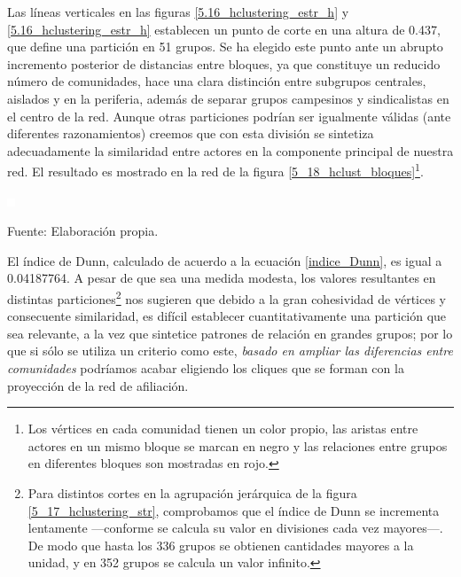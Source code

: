 \documentclass[letterpaper, 11pt]{book}
\theoremstyle{definition}
\theoremstyle{remark}
\begin{document}
Las líneas verticales en las figuras \ref{5.16_hclustering_estr_h} y \ref{5.16_hclustering_estr_h} establecen un punto de corte en una altura de 0.437, que define una partición en 51 grupos. 
Se ha elegido este punto ante un abrupto incremento posterior de distancias entre bloques, ya que constituye un reducido número de comunidades, hace una clara distinción entre subgrupos centrales, aislados y en la periferia, además de separar grupos campesinos y sindicalistas en el centro de la red. 
Aunque otras particiones podrían ser igualmente válidas (ante diferentes razonamientos) creemos que con esta división se sintetiza adecuadamente la similaridad entre actores en la componente principal de nuestra red. 
El resultado es mostrado en la red de la figura \ref{5_18_hclust_bloques}\footnote{
    Los vértices en cada comunidad tienen un color propio, las aristas entre actores en un mismo bloque se marcan en negro y las relaciones entre grupos en diferentes bloques son mostradas en rojo. 
}. 



\begin{minipage}{\linewidth}
\centering
{} \label{5_18_hclust_bloques}

\includegraphics[scale=0.1]{img/null.png}
\vspace{29em}
\par\bigskip
\small Fuente: Elaboración propia.
\end{minipage}\bigskip


El índice de Dunn, calculado de acuerdo a la ecuación \ref{indice_Dunn}, es igual a 0.04187764. 
A pesar de que sea una medida modesta, los valores resultantes en distintas particiones\footnote{
    Para distintos cortes en la agrupación jerárquica de la figura \ref{5_17_hclustering_str}, comprobamos que el índice de Dunn se incrementa lentamente ---conforme se calcula su valor en divisiones cada vez mayores---. 
    De modo que hasta los 336 grupos se obtienen cantidades mayores a la unidad, y en 352 grupos se calcula un valor infinito. 
} 
nos sugieren que debido a la gran cohesividad de vértices y consecuente similaridad, es difícil establecer cuantitativamente una partición que sea relevante, a la vez que sintetice patrones de relación en grandes grupos; por lo que si sólo se utiliza un criterio como este, \emph{basado en ampliar las diferencias entre comunidades} podríamos acabar eligiendo los cliques que se forman con la proyección de la red de afiliación. 
\end{document}
